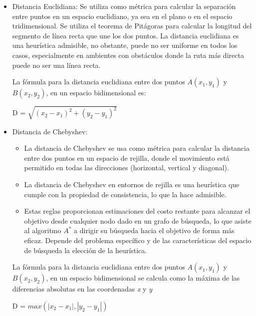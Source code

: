 \begin{itemize}
    \item Distancia Euclidiana:
        Se utiliza como métrica para calcular la separación entre puntos en un espacio euclidiano, 
        ya sea en el plano o en el espacio tridimensional. Se utiliza el teorema de Pitágoras para 
        calcular la longitud del segmento de línea recta que une los dos puntos. La distancia 
        euclidiana es una heurística admisible, no obstante, puede no ser uniforme en todos los 
        casos, especialmente en ambientes con obstáculos donde la ruta más directa puede no ser 
        una línea recta.

        La fórmula para la distancia euclidiana entre dos puntos $A(x_1, y_1)$ y $B(x_2,y_2)$, 
        en un espacio bidimensional es:
        \begin{center}
            D = $\sqrt{(x_2 - x_1)^2 + (y_2 - y_1)^2}$
        \end{center}

    \item  Distancia de Chebyshev:
        \begin{itemize}
            \item La distancia de Chebyshev se usa como métrica para calcular la distancia entre 
                    dos puntos en un espacio de rejilla, donde el movimiento está permitido en todas 
                    las direcciones (horizontal, vertical y diagonal).
            \item La distancia de Chebyshev en entornos de rejilla es una heurística que cumple 
                    con la propiedad de consistencia, lo que la hace admisible.
            \item Estas reglas proporcionan estimaciones del costo restante para alcanzar el 
                    objetivo desde cualquier nodo dado en un grafo de búsqueda, lo que asiste 
                    al algoritmo $A^{*}$ a dirigir su búsqueda hacia el objetivo de forma más 
                    eficaz. Depende del problema específico y de las características del 
                    espacio de búsqueda la elección de la heurística.
        \end{itemize}
        
        La fórmula para la distancia euclidiana entre dos puntos $A(x_1, y_1)$ y $B(x_2,y_2)$, en un espacio bidimensional se calcula como la máxima de las diferencias absolutas en las coordenadas \textit{x} y \textit{y}
        \begin{center}
            D = $max(|x_2 - x_1|,|y_2 - y_1|)$
        \end{center}
\end{itemize}